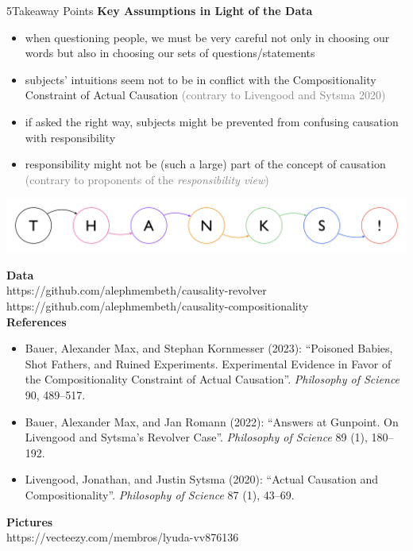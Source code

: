\documentclass[xcolor=table,9pt,aspectratio=169]{beamer}
\begin{document}
\begin{frame}{\vspace*{10mm}5\hspace*{1em}Takeaway Points}
\vspace*{-5mm}
\textbf{Key Assumptions in Light of the Data}
\begin{itemize}
   \item when questioning people, we must be very careful not only in choosing our words but also in choosing our sets of questions/statements
   \item subjects' intuitions seem not to be in conflict with the Compositionality Constraint of Actual Causation \textcolor{gray}{(contrary to Livengood and Sytsma 2020)}
   \item if asked the right way, subjects might be prevented from confusing causation with responsibility
   \item responsibility might not be (such a large) part of the concept of causation \textcolor{gray}{(contrary to proponents of the \textit{responsibility view})}
\end{itemize}
\end{frame}


\begin{frame}{}
\begin{center}
   {\includegraphics[width=0.9\linewidth]{figures/thanks.pdf}}
\end{center}
{\footnotesize
\textbf{Data}\\
https://github.com/alephmembeth/causality-revolver\\
https://github.com/alephmembeth/causality-compositionality\\
\vspace{1.5em}
\textbf{References}\\
\vspace{-0.5em}
\begin{itemize}[label=,leftmargin=2em,itemindent=-2em]
   \item Bauer, Alexander Max, and Stephan Kornmesser (2023): ``Poisoned Babies, Shot Fathers, and Ruined Experiments. Experimental Evidence in Favor of the Compositionality Constraint of Actual Causation''. \textit{Philosophy of Science} 90, 489--517.
   \item Bauer, Alexander Max, and Jan Romann (2022): ``Answers at Gunpoint. On Livengood and Sytsma's Revolver Case''. \textit{Philosophy of Science} 89 (1), 180--192.
   \item Livengood, Jonathan, and Justin Sytsma (2020): ``Actual Causation and Compositionality''. \textit{Philosophy of Science} 87 (1), 43--69.
\end{itemize}
\vspace{1em}
\textbf{Pictures}\\
https://vecteezy.com/membros/lyuda-vv876136\\
}
\end{frame}
\end{document}

